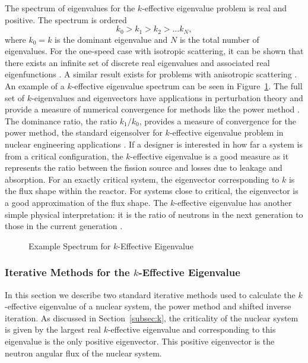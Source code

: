 The spectrum of eigenvalues for the $k$-effective eigenvalue problem is real and positive. The spectrum is ordered
\begin{equation}
	k_{0} > k_{1} > k_{2} > \dots k_{N},
\end{equation}
where $k_{0} = k$ is the dominant eigenvalue and $N$ is the total number of eigenvalues. For the one-speed case with isotropic scattering, it can be shown that there exists an infinite set of discrete real eigenvalues and associated real eigenfunctions \cite{lehner1955spectrum}. A similar result exists for problems with anisotropic scattering \cite{sahni_new_1996}. An example of a $k$-effective eigenvalue spectrum can be seen in Figure~\ref{fig:keffspec}. The full set of $k$-eigenvalues and eigenvectors have applications in perturbation theory and provide a measure of numerical convergence for methods like the power method \cite{lewis_computational_1984}. The dominance ratio, the ratio $k_{1}/k_{0}$, provides a measure of convergence for the power method, the standard eigensolver for $k$-effective eigenvalue problem in nuclear engineering applications \cite{lewis_computational_1984}. If a designer is interested in how far a system is from a critical configuration, the $k$-effective eigenvalue is a good measure as it represents the ratio between the fission source and losses due to leakage and absorption. For an exactly critical system, the eigenvector corresponding to $k$ is the flux shape within the reactor. For systems close to critical, the eigenvector is a good approximation of the flux shape. The $k$-effective eigenvalue has another simple physical interpretation: it is the ratio of neutrons in the next generation to those in the current generation \cite{ronen_comparison_1976}.

\begin{figure}
	\centering
	\resizebox{0.5\textwidth}{!}{
	
	}
	\caption{Example Spectrum for $k$-Effective Eigenvalue}
	\label{fig:keffspec}
\end{figure}

\subsubsection{Iterative Methods for the $k$-Effective Eigenvalue}

In this section we describe two standard iterative methods used to calculate the $k$-effective eigenvalue of a nuclear system, the power method and shifted inverse iteration. As discussed in Section~\ref{subsec:k}, the criticality of the nuclear system is given by the largest real $k$-effective eigenvalue and corresponding to this eigenvalue is the only positive eigenvector. This positive eigenvector is the neutron angular flux of the nuclear system. 

